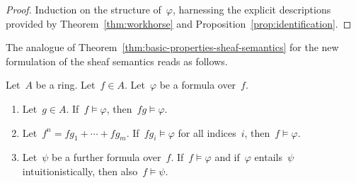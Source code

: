 \documentclass{ws-rv9x6}
\begin{document}
{\begin{proof}Induction on the structure of~$\varphi$, harnessing the explicit
descriptions provided by Theorem~\ref{thm:workhorse} and
Proposition~\ref{prop:identification}.\end{proof}

\begin{table}[ht]
  \label{table:algebraic-kripke-joyal}
\end{table}

The analogue of Theorem~\ref{thm:basic-properties-sheaf-semantics} for the new
formulation of the sheaf semantics reads as follows.

\begin{theorem}\label{thm:basic-properties-sheaf-semantics-algebraic}
Let~$A$ be a ring. Let~$f \in A$. Let~$\varphi$ be a formula over~$f$.
\begin{enumerate}
\item Let~$g \in A$. If~$f \models \varphi$, then~$fg \models \varphi$.
\item Let~$f^n = fg_1 + \cdots + fg_m$. If~$fg_i \models \varphi$ for all
indices~$i$, then~$f \models \varphi$.
\item Let~$\psi$ be a further formula over~$f$. If~$f \models
\varphi$ and if~$\varphi$ entails~$\psi$ intuitionistically, then also~$f
\models \psi$.
\end{enumerate}
\end{theorem}

}
\end{document}
